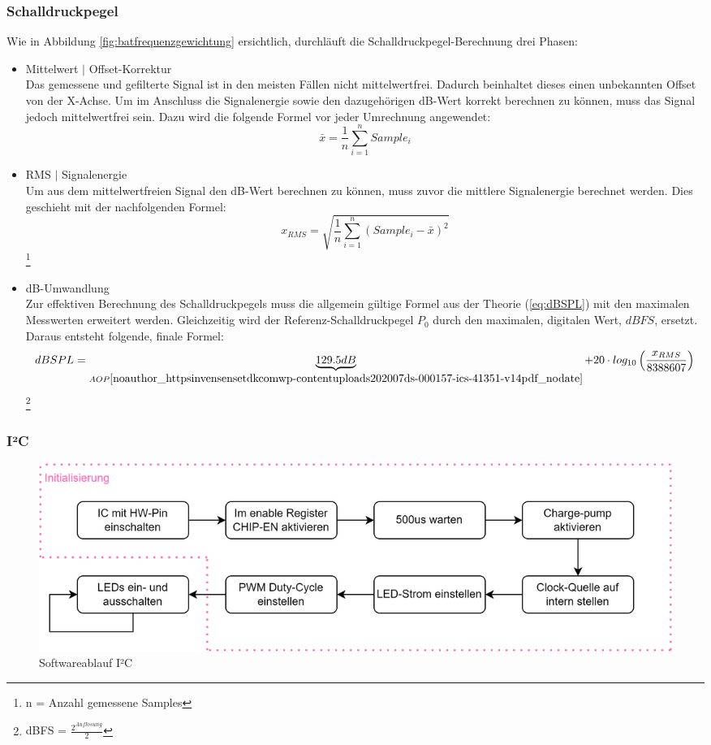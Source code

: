 \documentclass[12pt]{article}
\newcommand\blfootnote[1]{%
	\begingroup
	\renewcommand\thefootnote{}\footnote{#1}%
	\addtocounter{footnote}{-1}%
	\endgroup
}
\begin{document}
	\subsubsection*{Schalldruckpegel}
	Wie in Abbildung \ref{fig:batfrequenzgewichtung} ersichtlich, durchläuft die Schalldruckpegel-Berechnung drei Phasen:
	\begin{itemize}
		\item Mittelwert $\vert$ Offset-Korrektur\\
		Das gemessene und gefilterte Signal ist in den meisten Fällen nicht mittelwertfrei. Dadurch beinhaltet dieses einen unbekannten Offset von der X-Achse. Um im Anschluss die Signalenergie sowie den dazugehörigen dB-Wert korrekt berechnen zu können, muss das Signal jedoch mittelwertfrei sein. Dazu wird die folgende Formel vor jeder Umrechnung angewendet:
		\begin{equation}\label{eq:Mittelwert}
			\bar{x} = \frac{1}{n}\sum_{i=1}^{n} Sample_i
		\end{equation}
		\item RMS $\vert$ Signalenergie \\
		Um aus dem mittelwertfreien Signal den dB-Wert berechnen zu können, muss zuvor die mittlere Signalenergie berechnet werden. Dies geschieht mit der nachfolgenden Formel:
		\begin{equation}\label{eq:RMS}
			x_{RMS} = \sqrt{\frac{1}{n}\sum_{i=1}^{n} \left( Sample_i-\bar{x}\right)^2}
		\end{equation}\blfootnote{n = Anzahl gemessene Samples}
		\item dB-Umwandlung\\
		Zur effektiven Berechnung des Schalldruckpegels muss die allgemein gültige Formel aus der Theorie (\ref{eq:dBSPL}) mit den maximalen Messwerten erweitert werden. Gleichzeitig wird der Referenz-Schalldruckpegel $P_0$ durch den maximalen, digitalen Wert, $dBFS$, ersetzt. Daraus entsteht folgende, finale Formel:
		\begin{equation}\label{eq:dBSPL2}
			dBSPL = \underbrace{129.5dB}_{AOP \cite{noauthor_httpsinvensensetdkcomwp-contentuploads202007ds-000157-ics-41351-v14pdf_nodate}} + 20 \cdot log_{10}\left( \frac{x_{RMS}}{8388607}\right) 
		\end{equation}\blfootnote{dBFS = $\frac{2^{Aufl\ddot{o}sung}}{2}$}
	\end{itemize}
	\subsubsection*{I²C}
	\begin{figure}[H]
		\centering
		\includegraphics[width=1\linewidth]{images/BAT_Flussdiagramm_I2C_V2}
		\caption{Softwareablauf I²C}
		\label{fig:batflussdiagrammi2cv2}
	\end{figure}
\end{document}
